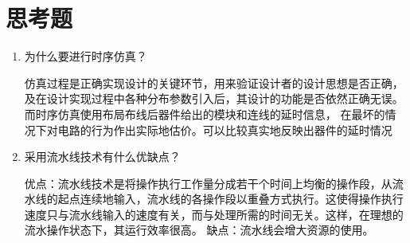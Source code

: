 \documentclass{../source/Experiment}
\begin{document}
\section{思考题}
\begin{enumerate}
    \item 为什么要进行时序仿真？

          仿真过程是正确实现设计的关键环节，用来验证设计者的设计思想是否正确，及在设计实现过程中各种分布参数引入后，其设计的功能是否依然正确无误。
          而时序仿真使用布局布线后器件给出的模块和连线的延时信息， 在最坏的情况下对电路的行为作出实际地估价。可以比较真实地反映出器件的延时情况

    \item 采用流水线技术有什么优缺点？

          优点：流水线技术是将操作执行工作量分成若干个时间上均衡的操作段，从流水线的起点连续地输入，流水线的各操作段以重叠方式执行。这使得操作执行速度只与流水线输入的速度有关，而与处理所需的时间无关。这样，在理想的流水操作状态下，其运行效率很高。
          缺点：流水线会增大资源的使用。
\end{enumerate}
\end{document}
